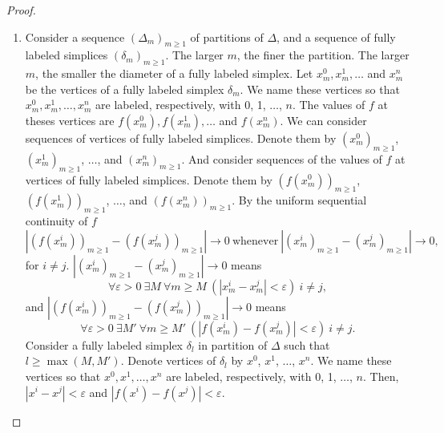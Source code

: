 \documentclass[reqno]{amsart}
\begin{document}
\begin{proof}
\begin{enumerate}
\item Consider a sequence $(\Delta_m)_{m\geq 1}$ of partitions of $\Delta$, and a sequence of fully labeled simplices $(\delta_m)_{m\geq 1}$. The larger $m$, the finer the partition. The larger $m$, the smaller the diameter of a fully labeled simplex. Let $x_m^0, x_m^1, \dots$ and $x_m^n$ be the vertices of a fully labeled simplex $\delta_m$. We name these vertices so that $x_m^0, x_m^1, \dots, x_m^n$ are labeled, respectively, with 0, 1, $\dots$, $n$. The values of $f$ at theses vertices are $f(x_m^0), f(x_m^1), \dots$ and $f(x_m^n)$. We can consider sequences of vertices of fully labeled simplices. Denote them by $(x_m^0)_{m\geq 1}$, $(x_m^1)_{m\geq 1}$, $\dots$, and $(x_m^n)_{m\geq 1}$. And consider sequences of the values of $f$ at vertices of fully labeled simplices. Denote them by $(f(x_m^0))_{m\geq 1}$, $(f(x_m^1))_{m\geq 1}$, $\dots$, and $(f(x_m^n))_{m\geq 1}$. By the uniform sequential continuity of $f$
\[|(f(x_m^i))_{m\geq 1}-(f(x_m^j))_{m\geq 1}|\longrightarrow 0\ \mathrm{whenever}\ |(x_m^i)_{m\geq 1}-(x_m^j)_{m\geq 1}|\longrightarrow 0,\]
for $i\neq j$. $|(x_m^i)_{m\geq 1}-(x_m^j)_{m\geq 1}|\longrightarrow 0$ means
\[\forall \varepsilon>0\ \exists M\ \forall m\geq M\ (|x_m^i-x^j_m|<\varepsilon)\ i\neq j,\]
and $|(f(x_m^i))_{m\geq 1}-(f(x_m^j))_{m\geq 1}|\longrightarrow 0$ means
\[\forall \varepsilon>0\ \exists M'\ \forall m\geq M'\ (|f(x^i_m)-f(x^j_m)|<\varepsilon)\ i\neq j.\]
Consider a fully labeled simplex $\delta_l$ in partition of $\Delta$ such that $l\geq \max(M, M')$. Denote vertices of $\delta_l$ by $x^0$, $x^1$, $\dots$, $x^n$. We name these vertices so that $x^0, x^1, \dots, x^n$ are labeled, respectively, with 0, 1, $\dots$, $n$. Then, $|x^i-x^j|<\varepsilon$ and $|f(x^i)-f(x^j)|<\varepsilon$.


\end{enumerate}
\end{proof}
\end{document}
